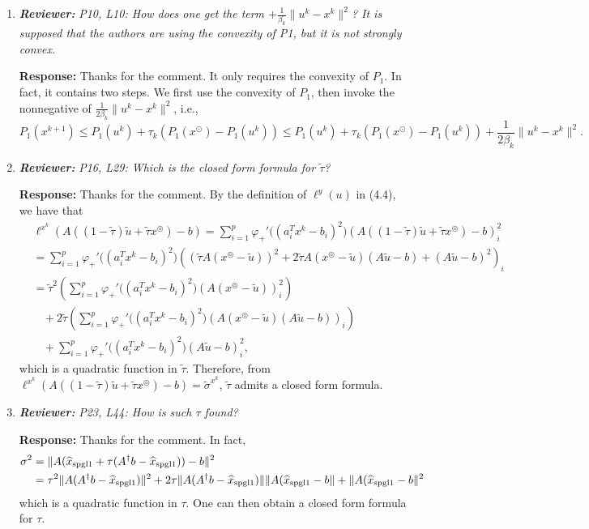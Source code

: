 \documentclass{article}
\begin{document}
\begin{enumerate}
	\item  \textit{\textbf{Reviewer:}} \textit{P10, L10: How does one get the term $+\frac{1}{\beta_k}\|u^k - x^k\|^2$? It is supposed that the authors are using the convexity of P1, but it is not strongly convex.}
	
	\textbf{Response:} Thanks for the comment. It only requires the convexity of $P_1$. In fact, it contains two steps. We first use the convexity of $P_1$, then invoke the nonnegative of $\frac{1}{2\beta_k}\|u^k - x^k\|^2$, i.e.,
\[
P_1(x^{k+1})\leq P_1(u^k) + \tau_k(P_1(x^\odot) - P_1(u^k))\leq P_1(u^k) + \tau_k(P_1(x^\odot) - P_1(u^k)) + \frac{1}{2\beta_k}\|u^k - x^k\|^2.
\]

	\item  \textit{\textbf{Reviewer:}} \textit{P16, L29: Which is the closed form formula for $\tilde{\tau}$?}
	
	\textbf{Response:} Thanks for the comment. By the definition of $\ell^{y}(u)$ in (4.4), we have that
\begin{equation*}
\begin{aligned}
&\ell^{x^k}(A((1-\widetilde\tau)\widetilde u + \widetilde\tau x^\circledcirc) - b) = \sum_{i=1}^p\varphi_+'\big((a_i^T x^k - b_i)^2\big)(A((1-\widetilde\tau)\widetilde u + \widetilde\tau x^\circledcirc) - b)_i^2\\
& = \sum_{i=1}^p\varphi_+'\big((a_i^T x^k - b_i)^2\big)((\widetilde\tau A(x^\circledcirc - \widetilde u))^2 + 2\widetilde\tau A(x^\circledcirc - \widetilde u)(A\widetilde u - b) + (A\widetilde u - b)^2)_i\\
&= \widetilde\tau^2(\sum_{i=1}^p\varphi_+'\big((a_i^T x^k - b_i)^2\big)(A(x^\circledcirc - \widetilde u))_i^2) \\
&~~~~+ 2\widetilde\tau (\sum_{i=1}^p\varphi_+'\big((a_i^T x^k - b_i)^2\big)(A(x^\circledcirc - \widetilde u)(A\widetilde u - b))_i) \\
&~~~~+ \sum_{i=1}^p\varphi_+'\big((a_i^T x^k - b_i)^2\big)(A\widetilde u - b)^2_i,
\end{aligned}
\end{equation*}
which is a quadratic function in $\widetilde\tau$. Therefore, from $\ell^{x^k}(A((1-\widetilde\tau)\widetilde u + \widetilde\tau x^\circledcirc) - b) = \tilde{\sigma}^{x^k}$, $\widetilde\tau$ admits a closed form formula.
	\item  \textit{\textbf{Reviewer:}} \textit{P23, L44: How is such $\tau$ found?}
	
	\textbf{Response:} Thanks for the comment. In fact,
\begin{equation*}
\begin{aligned}
\sigma^2 &= \|A(\widehat x_{\rm spgl1} + \tau(A^\dagger b - \widehat x_{\rm spgl1})) - b\|^2\\
 &=\tau^2\|A(A^\dagger b - \widehat x_{\rm spgl1})\|^2 + 2\tau\|A(A^\dagger b - \widehat x_{\rm spgl1})\|\|A(\widehat x_{\rm spgl1} - b\| + \|A(\widehat x_{\rm spgl1} - b\|^2
\end{aligned}
\end{equation*}
which is a quadratic function in $\tau$. One can then obtain a closed form formula for $\tau$.



\end{enumerate}
\end{document}
